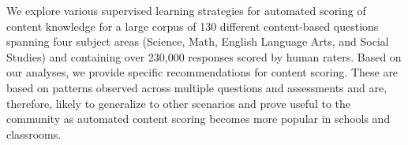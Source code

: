 We explore various supervised learning strategies for automated scoring of content knowledge for a large corpus of 130 different content-based questions spanning four subject areas (Science, Math, English Language Arts, and Social Studies) and containing over 230,000 responses scored by human raters. Based on our analyses, we provide specific recommendations for content scoring. These are based on patterns observed across multiple questions and assessments and are, therefore, likely to generalize to other scenarios and prove useful to the community as automated content scoring becomes more popular in schools and classrooms.
